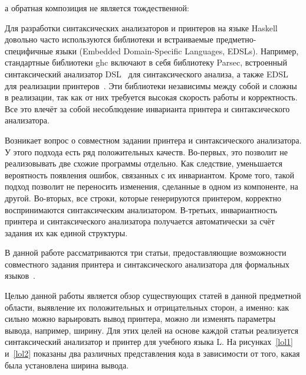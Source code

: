 

\noindent а обратная композиция не является тождественной:



Для разработки синтаксических анализаторов и принтеров на языке Haskell довольно часто используются 
библиотеки и встраиваемые предметно-специфичные языки (Embedded Domain-Specific Languages, EDSLs). Например, 
стандартные библиотеки ghc включают в себя библиотеку Parsec, встроенный синтаксический анализатор DSL~\cite{parsec} 
для синтаксического анализа, а также EDSL для реализации принтеров~\cite{Hughes1995}. Эти библиотеки независимы 
между собой и сложны в реализации, так как от них требуется высокая скорость работы и корректность. 
Все это влечёт за собой несоблюдение инварианта принтера и синтаксического анализатора.

Возникает вопрос о совместном задании принтера и синтаксического анализатора. У этого подхода есть ряд 
положительных качеств. Во-первых, это позволит не реализовывать две схожие программы отдельно. 
Как следствие, уменьшается вероятность появления ошибок, связанных с их инвариантом. Кроме того, 
такой подход позволит не переносить изменения, сделанные в одном из компоненте, на другой. Во-вторых, 
все строки, которые генерируются принтером, корректно воспринимаются синтаксическим анализатором. 
В-третьих, инвариантность принтера и синтаксического анализатора получается автоматически
за счёт задания их как единой структуры.

В данной работе рассматриваются три статьи, предоставляющие возможности совместного задания 
принтера и синтаксического анализатора для формальных языков~\cite{Rendel,Matsuda,Boespflug}.

Целью данной работы является обзор существующих статей в данной предметной области, выявление их 
положительных и отрицательных сторон, а именно: как сильно можно варьировать вывод принтера, 
можно ли изменять параметры вывода, например, ширину. Для этих целей на основе каждой статьи 
реализуется синтаксический анализатор и принтер для учебного языка L. На рисунках~\ref{lol1} и~\ref{lol2} 
показаны два различных представления кода в зависимости от того, какая была установлена ширина вывода.

